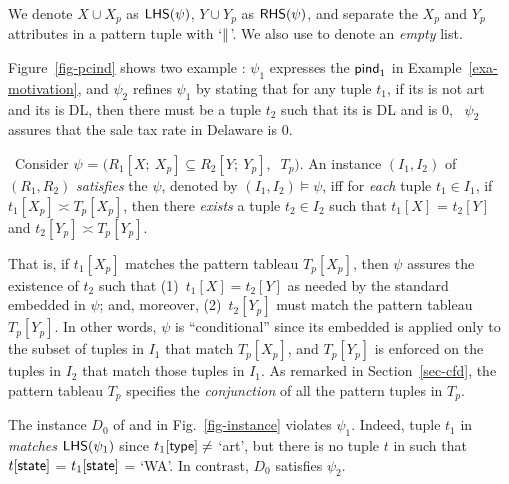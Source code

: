  We denote $X \cup X_p$ as ${\mathsf{LHS}}(\psi)$, $Y \cup Y_p$ as ${\mathsf{RHS}}(\psi)$, and
separate the $X_p$ and $Y_p$ attributes in a pattern tuple with
`$\parallel$'. We also use  to denote an {\em empty} list. 



\vspace{-0.5ex}
\begin{example}
\label{exam-pcind} Figure~\ref{fig-pcind} shows two example \pCINDs:
$\psi_1$ expresses the ${\mathsf{pind}}_1$ in Example~\ref{exa-motivation},
and $\psi_2$ refines $\psi_1$ by stating that for any 
tuple $t_1$, if its  is not art and its  is DL,
then there must be a  tuple $t_2$ such that its 
is DL and  is $0$, \ie~$\psi_2$ assures that the sale tax
rate in Delaware is 0.
\end{example}
\vspace{-1ex}






~Consider \pCIND $\psi$ =
$(R_1[X;\ X_p] \subseteq R_2[Y;\ Y_p],$ $\ T_p)$.
An instance  $(I_1, I_2)$ of $(R_1, R_2)$ {\em satisfies} the \pCIND
$\psi$, denoted by $(I_1, I_2) \models \psi$, iff for {\em each}
tuple $t_1\in I_1$, if $t_1[X_p] \asymp T_p[X_p]$, then there {\em
exists} a tuple $t_2\in I_2$ such that $t_1[X]$ = $t_2[Y]$ and $t_2[Y_p] \asymp T_p[Y_p]$.


That is, if $t_1[X_p]$ matches
the pattern tableau $T_p[X_p]$, then $\psi$ assures the
existence of $t_2$ such that (1)~$t_1[X] = t_2[Y]$ as
needed by the standard \IND embedded in $\psi$;
and, moreover, (2)~$t_2[Y_p]$
must match the pattern tableau $T_p[Y_p]$. In other words,
$\psi$ is ``conditional'' since its embedded \IND is applied only to the
subset of tuples in $I_1$ that match $T_p[X_p]$, and
$T_p[Y_p]$ is enforced on the tuples in $I_2$
that match those tuples in $I_1$. As remarked in Section~\ref{sec-cfd},
the pattern tableau $T_p$ specifies the {\em conjunction} of
all the pattern tuples in $T_p$.

\vspace{-0.5ex}
\begin{example}
The instance $D_0$ of  and  in
Fig.~\ref{fig-instance} violates \pCIND $\psi_1$. Indeed, tuple
$t_1$ in  {\em matches} ${\mathsf{LHS}}(\psi_1)$ since
$t_1[\protect\mathsf{type}] \ne $ `art', but there is no tuple $t$ in 
such that $t[\protect\mathsf{state}]$ = $t_1[\protect\mathsf{state}]$ = `WA'. In contrast,
$D_0$ satisfies $\psi_2$.
\end{example}


